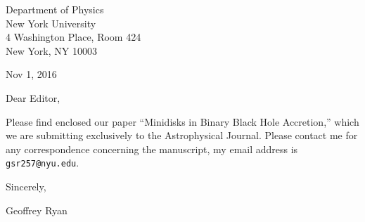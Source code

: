 \documentclass{letter}
\begin{document}
\begin{flushleft}
\begin{singlespace}
Department of Physics\\
New York University\\
4 Washington Place, Room 424\\
New York, NY 10003
\end{singlespace}

\vspace{0.5cm}

Nov 1, 2016

\vspace{0.5cm}

Dear Editor,

Please find enclosed our paper ``Minidisks in Binary Black Hole Accretion,'' which we are submitting exclusively to the Astrophysical Journal.  Please contact me for any correspondence concerning the manuscript, my email address is \texttt{gsr257@nyu.edu}.

\vspace{0.5cm}

Sincerely,

Geoffrey Ryan
\end{flushleft}
\end{document}
